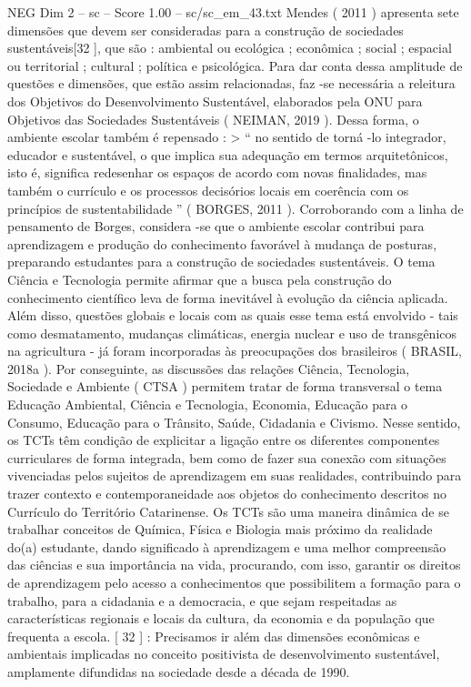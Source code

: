 \begin{textsample}{NEG Dim 2 – sc – Score 1.00 – sc/sc\_em\_43.txt}
Mendes ( 2011 ) apresenta sete dimensões que devem ser consideradas para a construção de sociedades sustentáveis[32 ], que são : ambiental ou ecológica ; econômica ; social ; espacial ou territorial ; cultural ; política e psicológica.
Para dar conta dessa amplitude de questões e dimensões, que estão assim relacionadas, faz -se necessária a releitura dos Objetivos do Desenvolvimento Sustentável, elaborados pela ONU para Objetivos das Sociedades Sustentáveis ( NEIMAN, 2019 ).
Dessa forma, o ambiente escolar também é repensado : > “ no sentido de torná -lo integrador, educador e sustentável, o que implica sua adequação em termos arquitetônicos, isto é, significa redesenhar os espaços de acordo com novas finalidades, mas também o currículo e os processos decisórios locais em coerência com os princípios de sustentabilidade ” ( BORGES, 2011 ).
Corroborando com a linha de pensamento de Borges, considera -se que o ambiente escolar contribui para aprendizagem e produção do conhecimento favorável à mudança de posturas, preparando estudantes para a construção de sociedades sustentáveis.
O tema Ciência e Tecnologia permite afirmar que a busca pela construção do conhecimento científico leva de forma inevitável à evolução da ciência aplicada.
Além disso, questões globais e locais com as quais esse tema está envolvido - tais como desmatamento, mudanças climáticas, energia nuclear e uso de transgênicos na agricultura - já foram incorporadas às preocupações dos brasileiros ( BRASIL, 2018a ).
Por conseguinte, as discussões das relações Ciência, Tecnologia, Sociedade e Ambiente ( CTSA ) permitem tratar de forma transversal o tema Educação Ambiental, Ciência e Tecnologia, Economia, Educação para o Consumo, Educação para o Trânsito, Saúde, Cidadania e Civismo.
Nesse sentido, os TCTs têm condição de explicitar a ligação entre os diferentes componentes curriculares de forma integrada, bem como de fazer sua conexão com situações vivenciadas pelos sujeitos de aprendizagem em suas realidades, contribuindo para trazer contexto e contemporaneidade aos objetos do conhecimento descritos no Currículo do Território Catarinense.
Os TCTs são uma maneira dinâmica de se trabalhar conceitos de Química, Física e Biologia mais próximo da realidade do(a) estudante, dando significado à aprendizagem e uma melhor compreensão das ciências e sua importância na vida, procurando, com isso, garantir os direitos de aprendizagem pelo acesso a conhecimentos que possibilitem a formação para o trabalho, para a cidadania e a democracia, e que sejam respeitadas as características regionais e locais da cultura, da economia e da população que frequenta a escola. [ 32 ] : Precisamos ir além das dimensões econômicas e ambientais implicadas no conceito positivista de desenvolvimento sustentável, amplamente difundidas na sociedade desde a década de 1990.

\end{textsample}
